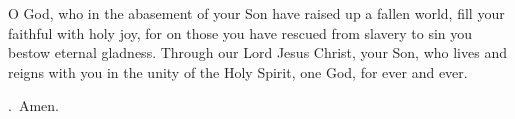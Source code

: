 \lettrine[lines=3]{O}{} God, who in the abasement of your Son
have raised up a fallen world,
fill your faithful with holy joy,
for on those you have rescued from slavery to sin
you bestow eternal gladness.
Through our Lord Jesus Christ, your Son,
who lives and reigns with you in the unity of the Holy Spirit,
one God, for ever and ever. \par \Rbar.~Amen.

